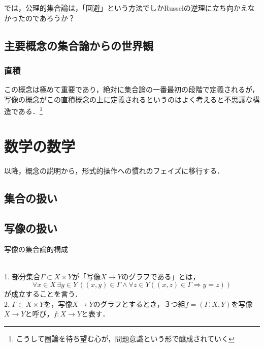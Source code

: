 \documentclass[uplatex, 12pt, a4paper, dvipdfmx]{jsreport}
\begin{document}
では，公理的集合論は，「回避」という方法でしかRusselの逆理に立ち向かえなかったのであろうか？

\section{主要概念の集合論からの世界観}

\subsection{直積}
この概念は極めて重要であり，絶対に集合論の一番最初の段階で定義されるが，写像の概念がこの直積概念の上に定義されるというのはよく考えると不思議な構造である．\footnote{こうして圏論を待ち望む心が，問題意識という形で醸成されていく}

\chapter{数学の数学}
以降，概念の説明から，形式的操作への慣れのフェイズに移行する．

\section{集合の扱い}



\section{写像の扱い}

\begin{itembox}[l]{写像の集合論的構成}
	\begin{definition}[mapping]\rm{}　\\
		1. 部分集合$\Gamma\subset X\times Y$が「写像$X\to Y$のグラフである」とは，$$\forall x\in X\, \exists y\in Y \, ((x,y)\in\Gamma\wedge \forall z\in Y((x,z)\in\Gamma\Rightarrow y=z))$$が成立することを言う．\\
		2. $\Gamma\subset X\times Y$を，写像$X\to Y$のグラフとするとき，３つ組$f=(\Gamma,X,Y)$を写像$X\to Y$と呼び，$f:X\to Y$と表す．
	\end{definition}
\end{itembox}
\end{document}
